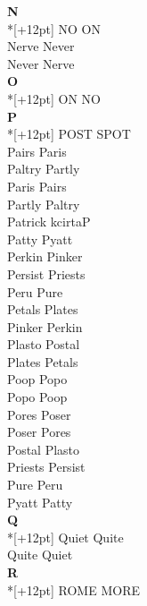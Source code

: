 \vspace{14pt}
\noindent\textbf{\Large N}\\*[+12pt]
NO ON\\
Nerve Never\\
Never Nerve\\

\vspace{14pt}
\noindent\textbf{\Large O}\\*[+12pt]
ON NO\\

\vspace{14pt}
\noindent\textbf{\Large P}\\*[+12pt]
POST SPOT\\
Pairs Paris\\
Paltry Partly\\
Paris Pairs\\
Partly Paltry\\
Patrick kcirtaP\\
Patty Pyatt\\
Perkin Pinker\\
Persist Priests\\
Peru Pure\\
Petals Plates\\
Pinker Perkin\\
Plasto Postal\\
Plates Petals\\
Poop Popo\\
Popo Poop\\
Pores Poser\\
Poser Pores\\
Postal Plasto\\
Priests Persist\\
Pure Peru\\
Pyatt Patty\\

\vspace{14pt}
\noindent\textbf{\Large Q}\\*[+12pt]
Quiet Quite\\
Quite Quiet\\

\vspace{14pt}
\noindent\textbf{\Large R}\\*[+12pt]
ROME MORE\\

